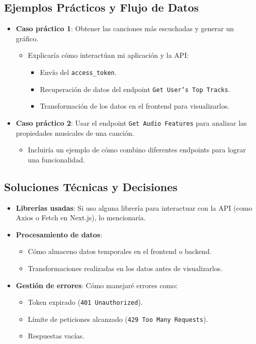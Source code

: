 \subsection{Ejemplos Prácticos y Flujo de Datos}
\begin{itemize}
    \item \textbf{Caso práctico 1}: Obtener las canciones más escuchadas y generar un gráfico.
          \begin{itemize}
              \item Explicaría cómo interactúan mi aplicación y la API:
                    \begin{itemize}
                        \item Envío del \texttt{access\_token}.
                        \item Recuperación de datos del endpoint \texttt{Get User's Top Tracks}.
                        \item Transformación de los datos en el frontend para visualizarlos.
                    \end{itemize}
          \end{itemize}
    \item \textbf{Caso práctico 2}: Usar el endpoint \texttt{Get Audio Features} para analizar las propiedades musicales de una canción.
          \begin{itemize}
              \item Incluiría un ejemplo de cómo combino diferentes endpoints para lograr una funcionalidad.
          \end{itemize}
\end{itemize}

\subsection{Soluciones Técnicas y Decisiones}
\begin{itemize}
    \item \textbf{Librerías usadas}: Si uso alguna librería para interactuar con la API (como Axios o Fetch en Next.js), lo mencionaría.
    \item \textbf{Procesamiento de datos}:
          \begin{itemize}
              \item Cómo almaceno datos temporales en el frontend o backend.
              \item Transformaciones realizadas en los datos antes de visualizarlos.
          \end{itemize}
    \item \textbf{Gestión de errores}: Cómo manejaré errores como:
          \begin{itemize}
              \item Token expirado (\texttt{401 Unauthorized}).
              \item Límite de peticiones alcanzado (\texttt{429 Too Many Requests}).
              \item Respuestas vacías.
          \end{itemize}
\end{itemize}

